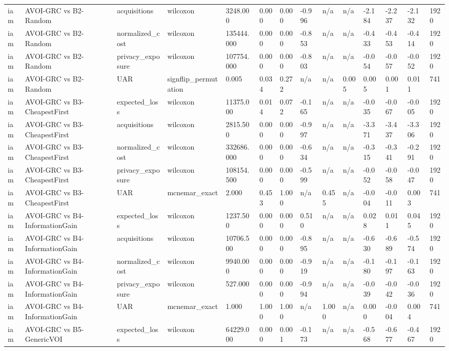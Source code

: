 \begin{table}[!ht]
{\begin{tabular}{llllllllllllll}
iam & AVOI-GRC vs B2-Random & acquisitions & wilcoxon & 3248.000 & 0.000 & 0.000 & -0.996 & n/a & n/a & -2.184 & -2.237 & -2.132 & 1920 \\
iam & AVOI-GRC vs B2-Random & normalized\_cost & wilcoxon & 135444.000 & 0.000 & 0.000 & -0.853 & n/a & n/a & -0.433 & -0.453 & -0.414 & 1920 \\
iam & AVOI-GRC vs B2-Random & privacy\_exposure & wilcoxon & 107754.000 & 0.000 & 0.000 & -0.803 & n/a & n/a & -0.054 & -0.057 & -0.052 & 1920 \\
iam & AVOI-GRC vs B2-Random & UAR & signflip\_permutation & 0.005 & 0.034 & 0.272 & n/a & n/a & 0.005 & 0.005 & 0.001 & 0.011 & 741 \\
iam & AVOI-GRC vs B3-CheapestFirst & expected\_loss & wilcoxon & 11375.000 & 0.014 & 0.072 & -0.165 & n/a & n/a & -0.035 & -0.067 & -0.005 & 1920 \\
iam & AVOI-GRC vs B3-CheapestFirst & acquisitions & wilcoxon & 2815.500 & 0.000 & 0.000 & -0.997 & n/a & n/a & -3.371 & -3.437 & -3.306 & 1920 \\
iam & AVOI-GRC vs B3-CheapestFirst & normalized\_cost & wilcoxon & 332686.000 & 0.000 & 0.000 & -0.634 & n/a & n/a & -0.315 & -0.341 & -0.291 & 1920 \\
iam & AVOI-GRC vs B3-CheapestFirst & privacy\_exposure & wilcoxon & 108154.500 & 0.000 & 0.000 & -0.599 & n/a & n/a & -0.052 & -0.058 & -0.047 & 1920 \\
iam & AVOI-GRC vs B3-CheapestFirst & UAR & mcnemar\_exact & 2.000 & 0.453 & 1.000 & n/a & 0.455 & n/a & -0.004 & -0.011 & 0.003 & 741 \\
iam & AVOI-GRC vs B4-InformationGain & expected\_loss & wilcoxon & 1237.500 & 0.000 & 0.000 & 0.510 & n/a & n/a & 0.028 & 0.011 & 0.045 & 1920 \\
iam & AVOI-GRC vs B4-InformationGain & acquisitions & wilcoxon & 10706.500 & 0.000 & 0.000 & -0.895 & n/a & n/a & -0.630 & -0.689 & -0.574 & 1920 \\
iam & AVOI-GRC vs B4-InformationGain & normalized\_cost & wilcoxon & 9940.000 & 0.000 & 0.000 & -0.919 & n/a & n/a & -0.180 & -0.197 & -0.163 & 1920 \\
iam & AVOI-GRC vs B4-InformationGain & privacy\_exposure & wilcoxon & 527.000 & 0.000 & 0.000 & -0.994 & n/a & n/a & -0.039 & -0.042 & -0.036 & 1920 \\
iam & AVOI-GRC vs B4-InformationGain & UAR & mcnemar\_exact & 1.000 & 1.000 & 1.000 & n/a & 1.000 & n/a & 0.000 & -0.004 & 0.004 & 741 \\
iam & AVOI-GRC vs B5-GenericVOI & expected\_loss & wilcoxon & 64229.000 & 0.000 & 0.001 & -0.173 & n/a & n/a & -0.568 & -0.677 & -0.467 & 1920 \\

\end{tabular}}
\end{table}
